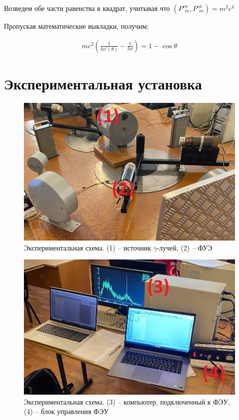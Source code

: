 \documentclass[a4paper,12pt]{article}
\begin{document}
Возведем обе части равенства в квадрат, учитывая что $(P'^{\mu}_m, P'^{\mu}_m) = m^2 c^4$

\pagebreak

Пропуская математические выкладки, получим:

\begin{align} \label{eq1:compton_scattering}
	mc^2 \left( \frac{1}{h\nu'(\theta)} - \frac{1}{h\nu} \right) = 1 - \cos \theta
\end{align}

\section*{Экспериментальная установка}

\begin{figure}[h!]
	\centering
	\includegraphics[width=0.8\linewidth]{setup_1}
	\caption{Экспериментальная схема. (1) -- источник $\gamma$-лучей, (2) -- ФУЭ}
\end{figure}

\begin{figure}[h!]
	\centering
	\includegraphics[width=0.8\linewidth]{setup_2}
	\caption{Экспериментальная схема. (3) -- компьютер, подключенный к ФЭУ, (4) -- блок управления ФЭУ}
\end{figure}
\end{document}
